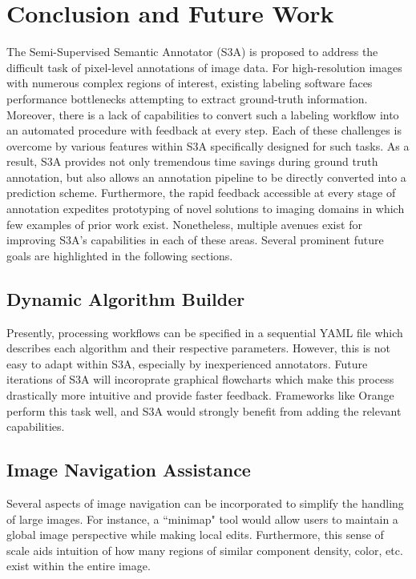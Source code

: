 \makeMetadataFig

\section{Conclusion and Future Work}
The Semi-Supervised Semantic Annotator (S3A) is proposed to address the difficult task of pixel-level annotations of image data.
For high-resolution images with numerous complex regions of interest, existing labeling software faces performance bottlenecks attempting to extract ground-truth information.
Moreover, there is a lack of capabilities to convert such a labeling workflow into an automated procedure with feedback at every step.
Each of these challenges is overcome by various features within S3A specifically designed for such tasks.
As a result, S3A provides not only tremendous time savings during ground truth annotation, but also allows an annotation pipeline to be directly converted into a prediction scheme.
Furthermore, the rapid feedback accessible at every stage of annotation expedites prototyping of novel solutions to imaging domains in which few examples of prior work exist.
Nonetheless, multiple avenues exist for improving S3A's capabilities in each of these areas.
Several prominent future goals are highlighted in the following sections.

\subsection{Dynamic Algorithm Builder}
Presently, processing workflows can be specified in a sequential YAML file which describes each algorithm and their respective parameters.
However, this is not easy to adapt within S3A, especially by inexperienced annotators.
Future iterations of S3A will incoroprate graphical flowcharts which make this process drastically more intuitive and provide faster feedback.
Frameworks like Orange~\citep{demsar_orange_2013} perform this task well, and S3A would strongly benefit from adding the relevant capabilities.

\subsection{Image Navigation Assistance}
Several aspects of image navigation can be incorporated to simplify the handling of large images.
For instance, a ``minimap" tool would allow users to maintain a global image perspective while making local edits.
Furthermore, this sense of scale aids intuition of how many regions of similar component density, color, etc.
exist within the entire image.


